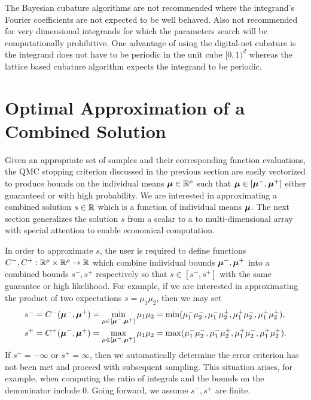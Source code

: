 \documentclass{article}[12pt]
\begin{document}
The Bayesian cubature algorithms are not recommended where the integrand's Fourier coefficients are not expected to be well behaved. Also not recommended for very dimensional integrands for which the parameters search will be computationally prohibitive.
One advantage of using the digital-net cubature is the integrand does not have to be periodic in the unit cube $[0, 1)^d$ whereas the lattice based cubature algorithm expects the integrand to be periodic. 

\section{Optimal Approximation of a Combined Solution}

Given an appropriate set of  samples and their corresponding function evaluations, the QMC stopping criterion discussed in the previous section are easily vectorized to produce bounds on the individual means $\boldsymbol{\mu} \in \mathbb{R}^\rho$ such that $\boldsymbol{\mu} \in [\boldsymbol{\mu}^-,\boldsymbol{\mu}^+]$ either guaranteed or with high probability. We are interested in approximating a combined solution $s \in \mathbb{R}$ which is a function of individual means $\boldsymbol{\mu}$.  The next section generalizes the solution $s$ from a scalar to a to multi-dimensional array with special attention to enable economical computation.

In order to approximate $s$, the user is required to define functions $C^-,C^+: \mathbb{R}^\rho \times \mathbb{R}^\rho \to \mathbb{R}$ which combine individual bounds $\boldsymbol{\mu}^-,\boldsymbol{\mu}^+$ into a combined bounds $s^-,s^+$ respectively so that $s \in [s^-,s^+]$ with the same guarantee or high likelihood. For example, if we are interested in approximating the product of two expectations $s=\mu_1\mu_2$, then we may set
\begin{align*}
    s^- &= C^-(\boldsymbol{\mu}^-,\boldsymbol{\mu}^+) = \min_{\mu \in [\boldsymbol{\mu}^-,\boldsymbol{\mu}^+]} \mu_1\mu_2 = \min(\mu_1^-\mu_2^-,\mu_1^-\mu_2^+,\mu_1^+\mu_2^-,\mu_1^+\mu_2^+), \\
    s^+ &= C^+(\boldsymbol{\mu}^-,\boldsymbol{\mu}^+) = \max_{\mu \in [\boldsymbol{\mu}^-,\boldsymbol{\mu}^+]} \mu_1\mu_2 = \max(\mu_1^-\mu_2^-,\mu_1^-\mu_2^+,\mu_1^+\mu_2^-,\mu_1^+\mu_2^+).
\end{align*}
If $s^-=-\infty$ or $s^+=\infty$, then we automatically determine the error criterion has not been met and proceed with subsequent sampling. This situation arises, for example, when computing the ratio of integrals and the bounds on the denominator include 0. Going forward, we assume $s^-,s^+$ are finite. 
\end{document}
